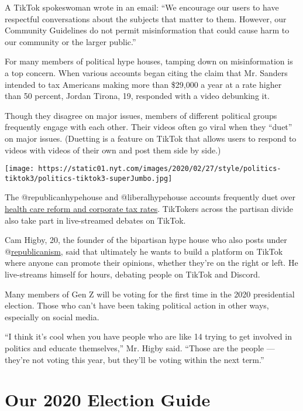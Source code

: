 A TikTok spokeswoman wrote in an email: ``We encourage our users to have
respectful conversations about the subjects that matter to them.
However, our Community Guidelines do not permit misinformation that
could cause harm to our community or the larger public.''

For many members of political hype houses, tamping down on
misinformation is a top concern. When various accounts began citing the
claim that Mr. Sanders intended to tax Americans making more than
\$29,000 a year at a rate higher than 50 percent, Jordan Tirona, 19,
responded with a video debunking it.

Though they disagree on major issues, members of different political
groups frequently engage with each other. Their videos often go viral
when they ``duet'' on major issues. (Duetting is a feature on TikTok
that allows users to respond to videos with videos of their own and post
them side by side.)

\texttt{[image: https://static01.nyt.com/images/2020/02/27/style/politics-tiktok3/politics-tiktok3-superJumbo.jpg]}

The @republicanhypehouse and @liberalhypehouse accounts frequently duet
over \href{https://vm.tiktok.com/bq32C5/}{health care reform and
corporate tax rates}. TikTokers across the partisan divide also take
part in live-streamed debates on TikTok.

Cam Higby, 20, the founder of the bipartisan hype house who also posts
under @\href{https://www.tiktok.com/@republicanism}{republicanism}, said
that ultimately he wants to build a platform on TikTok where anyone can
promote their opinions, whether they're on the right or left. He
live-streams himself for hours, debating people on TikTok and Discord.

Many members of Gen Z will be voting for the first time in the 2020
presidential election. Those who can't have been taking political action
in other ways, especially on social media.

``I think it's cool when you have people who are like 14 trying to get
involved in politics and educate themselves,'' Mr. Higby said. ``Those
are the people --- they're not voting this year, but they'll be voting
within the next term.''

\hypertarget{our-2020-election-guide}{%
\section{Our 2020 Election Guide}\label{our-2020-election-guide}}

